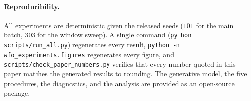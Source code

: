 \documentclass[11pt]{article}
\begin{document}
\paragraph{Reproducibility.} All experiments are deterministic given the
released seeds ($101$ for the main batch, $303$ for the window sweep). A
single command (\texttt{python scripts/run\_all.py}) regenerates every
result, \texttt{python -m wfo\_experiments.figures} regenerates every
figure, and \texttt{scripts/check\_paper\_numbers.py} verifies that every
number quoted in this paper matches the generated results to rounding. The
generative model, the five procedures, the diagnostics, and the analysis are
provided as an open-source package.

\small


\end{document}
